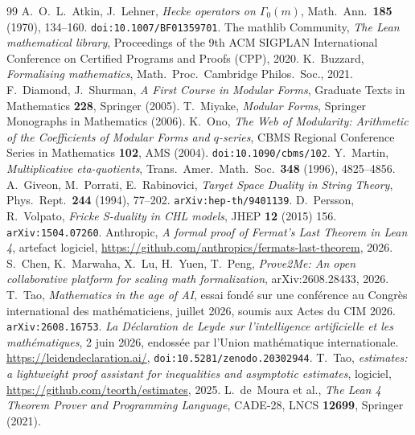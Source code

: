 \documentclass[11pt, a4paper]{article}
\theoremstyle{remark}
\begin{document}
\begin{thebibliography}{99}
 A.~O.~L.~Atkin, J.~Lehner, \textit{Hecke operators on $\Gamma_0(m)$}, Math.\ Ann.\ \textbf{185} (1970), 134--160. \texttt{doi:10.1007/BF01359701}.
 The mathlib Community, \textit{The Lean mathematical library}, Proceedings of the 9th ACM SIGPLAN International Conference on Certified Programs and Proofs (CPP), 2020.
 K.~Buzzard, \textit{Formalising mathematics}, Math.\ Proc.\ Cambridge Philos.\ Soc., 2021.
 F.~Diamond, J.~Shurman, \textit{A First Course in Modular Forms}, Graduate Texts in Mathematics \textbf{228}, Springer (2005).
 T.~Miyake, \textit{Modular Forms}, Springer Monographs in Mathematics (2006).
 K.~Ono, \textit{The Web of Modularity: Arithmetic of the Coefficients of Modular Forms and $q$-series}, CBMS Regional Conference Series in Mathematics \textbf{102}, AMS (2004). \texttt{doi:10.1090/cbms/102}.
 Y.~Martin, \textit{Multiplicative eta-quotients}, Trans.\ Amer.\ Math.\ Soc.\ \textbf{348} (1996), 4825--4856.
 A.~Giveon, M.~Porrati, E.~Rabinovici, \textit{Target Space Duality in String Theory}, Phys.\ Rept.\ \textbf{244} (1994), 77--202. \texttt{arXiv:hep-th/9401139}.
 D.~Persson, R.~Volpato, \textit{Fricke S-duality in CHL models}, JHEP \textbf{12} (2015) 156. \texttt{arXiv:1504.07260}.
 Anthropic, \textit{A formal proof of Fermat's Last Theorem in Lean 4}, artefact logiciel, \url{https://github.com/anthropics/fermats-last-theorem}, 2026.
 S.~Chen, K.~Marwaha, X.~Lu, H.~Yuen, T.~Peng, \textit{Prove2Me: An open collaborative platform for scaling math formalization}, arXiv:2608.28433, 2026.
 T.~Tao, \textit{Mathematics in the age of AI}, essai fondé sur une conférence
au Congrès international des mathématiciens, juillet 2026, soumis aux Actes du CIM 2026.
\texttt{arXiv:2608.16753}.
 \textit{La Déclaration de Leyde sur l'intelligence artificielle et les
mathématiques}, 2 juin 2026, endossée par l'Union mathématique internationale.
\url{https://leidendeclaration.ai/}, \texttt{doi:10.5281/zenodo.20302944}.
 T.~Tao, \textit{estimates: a lightweight proof assistant for inequalities and asymptotic estimates}, logiciel, \url{https://github.com/teorth/estimates}, 2025.
 L.~de~Moura et al., \textit{The Lean 4 Theorem Prover and Programming Language}, CADE-28, LNCS \textbf{12699}, Springer (2021).
\end{thebibliography}
\end{document}
